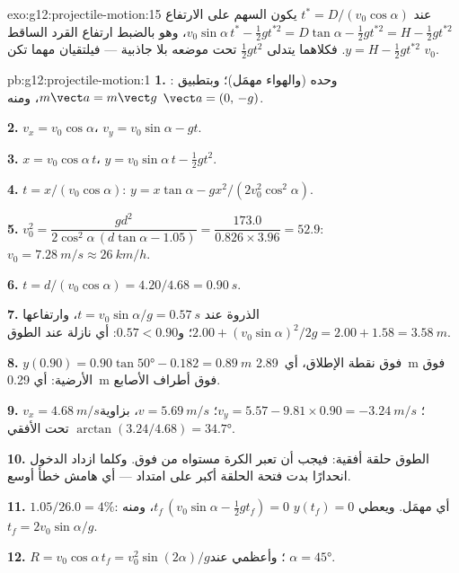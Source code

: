 \begin{solution}{exo:g12:projectile-motion:15}
عند $t^* = D/(v_0\cos\alpha)$ يكون السهم على الارتفاع
$v_0\sin\alpha\, t^* - \tfrac12 g t^{*2} = D\tan\alpha - \tfrac12 g
t^{*2} = H - \tfrac12 g t^{*2}$، وهو بالضبط ارتفاع القرد الساقط
$y = H - \tfrac12 g t^{*2}$. فكلاهما يتدلى $\tfrac12 gt^2$ تحت موضعه
بلا جاذبية --- فيلتقيان مهما تكن $v_0$.
\end{solution}

\begin{solution}{pb:g12:projectile-motion:1}
\textbf{1.}  وحده (والهواء مهمَل)؛ وبتطبيق :
$m\vect a = m\vect g$، ومنه $\vect a = (0,\,-g)$.

\textbf{2.} $v_x = v_0\cos\alpha$، $v_y = v_0\sin\alpha - gt$.

\textbf{3.} $x = v_0\cos\alpha\, t$،
$y = v_0\sin\alpha\, t - \tfrac12 gt^2$.

\textbf{4.} $t = x/(v_0\cos\alpha)$:
$y = x\tan\alpha - g x^2/(2v_0^2\cos^2\alpha)$.

\textbf{5.} $v_0^2 = \dfrac{g d^2}{2\cos^2\alpha\,(d\tan\alpha -
1.05)} = \dfrac{173.0}{0.826 \times 3.96} = 52.9$:
$v_0 = \qty{7.28}{m/s} \approx \qty{26}{km/h}$.

\textbf{6.} $t = d/(v_0\cos\alpha) = 4.20/4.68 = \qty{0.90}{s}$.

\textbf{7.} الذروة عند $t = v_0\sin\alpha/g = \qty{0.57}{s}$، وارتفاعها
$2.00 + (v_0\sin\alpha)^2/2g = 2.00 + 1.58 = \qty{3.58}{m}$؛
و$0.57 < 0.90$: أي نازلة عند الطوق.

\textbf{8.} $y(0.90) = 0.90\tan\ang{50} - 0.182 = \qty{0.89}{m}$
فوق نقطة الإطلاق، أي\ \qty{2.89}{m} فوق الأرضية: أي \qty{0.29}{m}
فوق أطراف الأصابع.

\textbf{9.} $v_x = \qty{4.68}{m/s}$؛
$v_y = 5.57 - 9.81 \times 0.90 = \qty{-3.24}{m/s}$؛
$v = \qty{5.69}{m/s}$، بزاوية $\arctan(3.24/4.68) = \ang{34.7}$ تحت
الأفقي.

\textbf{10.} الطوق حلقة أفقية: فيجب أن تعبر الكرة مستواه
من فوق. وكلما ازداد الدخول انحدارًا بدت فتحة الحلقة
أكبر على امتداد  --- أي هامش خطأ أوسع.

\textbf{11.} $1.05/26.0 = 4\%$: أي مهمَل. ويعطي $y(t_f) = 0$
$t_f\,(v_0\sin\alpha - \tfrac12 g t_f) = 0$، ومنه
$t_f = 2v_0\sin\alpha/g$.

\textbf{12.} $R = v_0\cos\alpha\, t_f = v_0^2\sin(2\alpha)/g$؛
وأعظمي عند $\alpha = \ang{45}$.


\end{solution}
